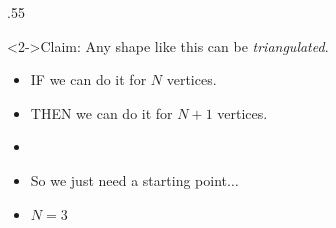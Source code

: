 \begin{frame}{}
\begin{columns}[T]
\begin{column}{.55\textwidth}
            \begin{block}<2->{Claim:}
                Any shape like this can be \textit{triangulated}.
            \end{block} 
            \begin{itemize}
                \item<3->[] IF we can do it for $N$ vertices. 
                \item<8->[] THEN we can do it for $N+1$ vertices. 
                \item[] 
                \item<13->[] So we just need a starting point$\dots$ 
                \item<14->[] $N=3$ 
            \end{itemize}
        \end{column}
    \end{columns}
\end{frame}


